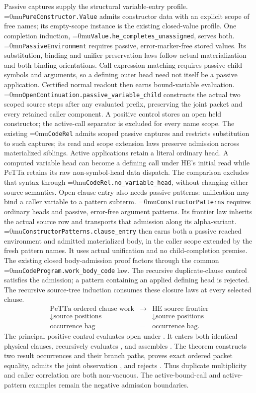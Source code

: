 \documentclass[11pt,a4paper]{article}
\newcommand{\code}[1]{\texttt{\detokenize{#1}}}
\newcommand{\name}[1]{\textup{\Urlmuskip=0mu\relax\nolinkurl{#1}}}
\begin{document}
Passive captures supply the structural variable-entry profile.
\name{PureConstructor.Value} admits constructor data with an explicit scope
of free names; its empty-scope instance is the existing closed-value profile.
One completion induction, \name{Value.he_completes_unassigned}, serves both.
\name{PassiveEnvironment} requires passive, error-marker-free stored values.
Its substitution, binding and unifier preservation laws follow actual
materialization and both binding orientations. Call-expression matching
requires passive child symbols and arguments, so a defining outer head need
not itself be a passive application. Certified normal readout then earns
bound-variable evaluation. \name{OpenContinuation.passive_variable_child}
constructs the actual two scoped source steps after any evaluated prefix,
preserving the joint packet and every retained caller component. A positive
control stores an open held constructor; the active-call separator is excluded
for every name scope. The existing \name{CodeRel} admits scoped passive
captures and restricts substitution to such captures; its read and scope
extension laws preserve admission across materialized siblings. Active
applications retain a literal ordinary head. A computed variable head can
become a defining call under HE's initial read while PeTTa retains its raw
non-symbol-head data dispatch. The comparison excludes that syntax through
\name{CodeRel.no_variable_head}, without changing either source semantics.
Open clause entry also needs passive patterns: unification may bind a caller
variable to a pattern subterm. \name{ConstructorPatterns} requires ordinary
heads and passive, error-free argument patterns. Its frontier law inherits
the actual source row and transports that admission along its alpha-variant.
\name{ConstructorPatterns.clause_entry} then earns both a passive reached
environment and admitted materialized body, in the caller scope extended by
the fresh pattern names. It uses actual unification and no child-completion
premise. The existing closed body-admission proof factors through the common
\name{CodeProgram.work_body_code} law. The recursive duplicate-clause control
satisfies the admission; a pattern containing an applied defining head is
rejected. The recursive source-tree induction consumes these closure laws at
every selected clause.
\[
\begin{array}{ccc}
 \text{PeTTa ordered clause work}&\longrightarrow&\text{HE source frontier}\\
 \downarrow\scriptstyle\text{source positions}&&
 \downarrow\scriptstyle\text{source positions}\\
 \text{occurrence bag}&=&\text{occurrence bag}.
\end{array}
\]
The principal positive control evaluates open \code{(fork \$x)} under
\code{x = Z}. It enters both identical physical clauses, recursively evaluates
\code{strip}, and assembles \code{Box Z}. The theorem constructs two result
occurrences and their branch paths, proves exact ordered packet equality,
admits the joint observation \code{[Box Z,Z]}, and rejects
\code{[Box Z,S Z]}. Thus duplicate multiplicity and caller correlation are
both non-vacuous. The active-bound-call and active-pattern examples remain
the negative admission boundaries.
\end{document}
